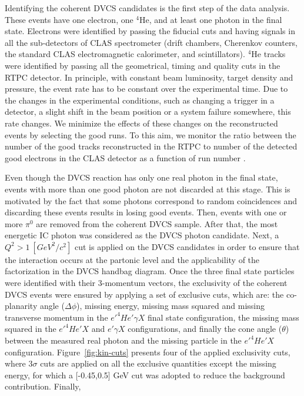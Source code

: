 \documentclass[nofootinbib,twocolumn,showpacs,prl,superscriptaddress,secnumarabic,amssymb,nobibnotes,aps,floatfix]{revtex4}
\begin{document}
Identifying the coherent DVCS candidates is the first step of the data 
analysis. These events have one electron, one $^4$He, and at least one photon 
in the final state. Electrons were identified by passing the fiducial cuts and 
having signals in all the sub-detectors of CLAS spectrometer (drift chambers, 
Cherenkov counters, the standard CLAS electromagnetic calorimeter, and 
scintillators). $^4$He tracks were identified by passing all the geometrical, 
timing and quality cuts in the RTPC detector. In principle, with constant beam 
luminosity, target density and pressure, the event rate has to be constant over 
the experimental time. Due to the changes in the experimental conditions, such 
as changing a trigger in a detector, a slight shift in the beam position or a 
system failure somewhere, this rate changes. We minimize the effects of these 
changes on the reconstructed events by selecting the good runs. To this aim, we 
monitor the ratio between the number of the good tracks reconstructed in the 
RTPC to number of the detected good electrons in the CLAS detector as a 
function of run number \cite{eg6_note}.

Even though the DVCS reaction has only one real photon in the final state, 
events with more than one good photon are not discarded at this stage. This is 
motivated by the fact that some photons correspond to random coincidences and 
discarding these events results in losing good events. Then, events with one or 
more $\pi^{0}$ are removed from the coherent DVCS sample. After that, the most 
energetic IC photon was considered as the DVCS photon candidate. Next, a 
$Q^{2}>1~[GeV^{2}/c^{2}]$ cut is applied on the DVCS candidates in order to 
ensure that the interaction occurs at the partonic level and the applicability 
of the factorization in the DVCS handbag diagram.  Once the three final state 
particles were identified with their 3-momentum vectors, the exclusivity of the 
coherent DVCS events were ensured by applying a set of exclusive cuts, which 
are: the co-planarity angle ($\Delta \phi$), missing energy, missing mass 
squared and missing transverse momentum in the $e'^4He'\gamma X$ final state 
configuration, the missing mass squared in the $e'^4He'X$ and $e'\gamma X$ 
configurations, and finally the cone angle ($\theta$) between the measured real 
photon and the missing particle in the $e'^4He'X$ configuration.  
Figure~\ref{fig:kin-cuts} presents four of the applied exclusivity cuts, where 
3$\sigma$ cuts are applied on all the exclusive quantities except the missing 
energy, for which a [-0.45,0.5] GeV cut was adopted to reduce the background 
contribution. Finally, 
\end{document}
